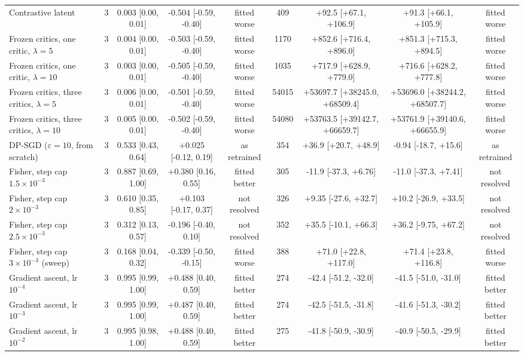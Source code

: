 \begin{tabular}{lcccccccc}
Contrastive latent & 3 & 0.003 [0.00, 0.01] & -0.504 [-0.59, -0.40] & fitted worse & 409 & +92.5 [+67.1, +106.9] & +91.3 [+66.1, +105.9] & fitted worse \\
Frozen critics, one critic, $\lambda=5$ & 3 & 0.004 [0.00, 0.01] & -0.503 [-0.59, -0.40] & fitted worse & 1170 & +852.6 [+716.4, +896.0] & +851.3 [+715.3, +894.5] & fitted worse \\
Frozen critics, one critic, $\lambda=10$ & 3 & 0.003 [0.00, 0.01] & -0.505 [-0.59, -0.40] & fitted worse & 1035 & +717.9 [+628.9, +779.0] & +716.6 [+628.2, +777.8] & fitted worse \\
Frozen critics, three critics, $\lambda=5$ & 3 & 0.006 [0.00, 0.01] & -0.501 [-0.59, -0.40] & fitted worse & 54015 & +53697.7 [+38245.0, +68509.4] & +53696.0 [+38244.2, +68507.7] & fitted worse \\
Frozen critics, three critics, $\lambda=10$ & 3 & 0.005 [0.00, 0.01] & -0.502 [-0.59, -0.40] & fitted worse & 54080 & +53763.5 [+39142.7, +66659.7] & +53761.9 [+39140.6, +66655.9] & fitted worse \\
DP-SGD ($\varepsilon=10$, from scratch) & 3 & 0.533 [0.43, 0.64] & +0.025 [-0.12, 0.19] & as retrained & 354 & +36.9 [+20.7, +48.9] & -0.94 [-18.7, +15.6] & as retrained \\
\midrule
Fisher, step cap $1.5\times 10^{-3}$ & 3 & 0.887 [0.69, 1.00] & +0.380 [0.16, 0.55] & fitted better & 305 & -11.9 [-37.3, +6.76] & -11.0 [-37.3, +7.41] & not resolved \\
Fisher, step cap $2\times 10^{-3}$ & 3 & 0.610 [0.35, 0.85] & +0.103 [-0.17, 0.37] & not resolved & 326 & +9.35 [-27.6, +32.7] & +10.2 [-26.9, +33.5] & not resolved \\
Fisher, step cap $2.5\times 10^{-3}$ & 3 & 0.312 [0.13, 0.57] & -0.196 [-0.40, 0.10] & not resolved & 352 & +35.5 [-10.1, +66.3] & +36.2 [-9.75, +67.2] & not resolved \\
Fisher, step cap $3\times 10^{-3}$ (sweep) & 3 & 0.168 [0.04, 0.32] & -0.339 [-0.50, -0.15] & fitted worse & 388 & +71.0 [+22.8, +117.0] & +71.4 [+23.8, +116.8] & fitted worse \\
Gradient ascent, lr $10^{-4}$ & 3 & 0.995 [0.99, 1.00] & +0.488 [0.40, 0.59] & fitted better & 274 & -42.4 [-51.2, -32.0] & -41.5 [-51.0, -31.0] & fitted better \\
Gradient ascent, lr $10^{-3}$ & 3 & 0.995 [0.99, 1.00] & +0.487 [0.40, 0.59] & fitted better & 274 & -42.5 [-51.5, -31.8] & -41.6 [-51.3, -30.2] & fitted better \\
Gradient ascent, lr $10^{-2}$ & 3 & 0.995 [0.98, 1.00] & +0.488 [0.40, 0.59] & fitted better & 275 & -41.8 [-50.9, -30.9] & -40.9 [-50.5, -29.9] & fitted better \\

\end{tabular}
